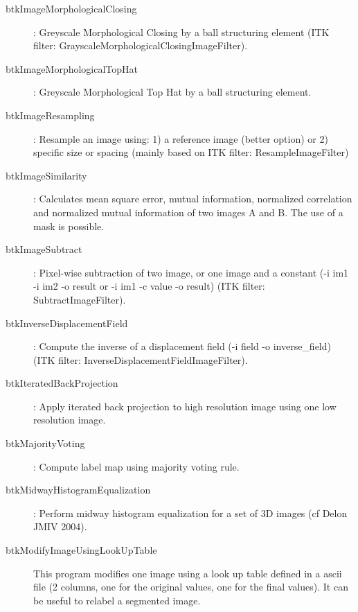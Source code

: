 \begin{description}
\item[btkImageMorphologicalClosing]: Greyscale Morphological Closing by a ball structuring element (ITK filter: GrayscaleMorphologicalClosingImageFilter).
\item[btkImageMorphologicalTopHat]: Greyscale Morphological Top Hat by a ball structuring element.
\item[btkImageResampling]: Resample an image using: 1) a reference image (better option) or 2) specific size or spacing (mainly based on ITK filter: ResampleImageFilter)
\item[btkImageSimilarity]: Calculates mean square error, mutual information, normalized correlation and normalized mutual information of two images A and B. The use of a mask is possible.
\item[btkImageSubtract]: Pixel-wise subtraction of two image, or one image and a constant (-i im1 -i im2 -o result or -i im1 -c value -o result) (ITK filter: SubtractImageFilter).
\item[btkInverseDisplacementField]: Compute the inverse of a displacement field (-i field -o inverse\_field) (ITK filter: InverseDisplacementFieldImageFilter).
\item[btkIteratedBackProjection]: Apply iterated back projection to high resolution image using one low resolution image.
\item[btkMajorityVoting]: Compute label map using majority voting rule.
\item[btkMidwayHistogramEqualization]: Perform midway histogram equalization for a set of 3D images (cf Delon JMIV 2004).
\item[btkModifyImageUsingLookUpTable] This program modifies one image using a
look up table defined in a ascii file (2 columns, one for the original values,
one for the final values). It can be useful to relabel a segmented image. 


\end{description}
